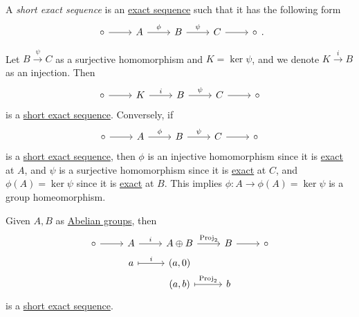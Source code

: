 \begin{definition}\label{def:short-exact-sequence}
	A \emph{short exact sequence} is an \hyperref[def:exact-sequence]{exact sequence} such that it has the following form
	\[
		\begin{tikzcd}
			\circ & A & B & C & \circ
			\arrow["\phi", from=1-2, to=1-3]
			\arrow["\psi", from=1-3, to=1-4]
			\arrow[from=1-1, to=1-2]
			\arrow[from=1-4, to=1-5]
		\end{tikzcd}.
	\]
\end{definition}

\begin{remark}
	Let \(B \overset{\psi}{\longrightarrow} C\) as a surjective homomorphism and \(K = \ker  \psi \), and we denote \(K \overset{i}{\longrightarrow}B \) as an injection. Then
	\[
		\begin{tikzcd}
			\circ & K & B & C & \circ
			\arrow["i", from=1-2, to=1-3]
			\arrow["\psi", from=1-3, to=1-4]
			\arrow[from=1-1, to=1-2]
			\arrow[from=1-4, to=1-5]
		\end{tikzcd}
	\]
	is a \hyperref[def:short-exact-sequence]{short exact sequence}. Conversely, if
	\[
		\begin{tikzcd}
			\circ & A & B & C & \circ
			\arrow["\phi ", from=1-2, to=1-3]
			\arrow["\psi", from=1-3, to=1-4]
			\arrow[from=1-1, to=1-2]
			\arrow[from=1-4, to=1-5]
		\end{tikzcd}
	\]
	is a \hyperref[def:short-exact-sequence]{short exact sequence}, then \(\phi \) is an injective homomorphism since it is \hyperref[def:apx:exact]{exact} at \(A\),
	and \(\psi \) is a surjective homomorphism since it is \hyperref[def:apx:exact]{exact} at \(C\), and \(\phi (A) = \ker \psi\) since it is \hyperref[def:apx:exact]{exact} at \(B\).
	This implies \(\phi \colon A\to \phi (A) = \ker  \psi \) is a group homeomorphism.
\end{remark}
\begin{eg}
	Given \(A, B\) as \hyperref[def:Abelian-group]{Abelian groups}, then
	\[
		\begin{tikzcd}[row sep=tiny]
			\circ & A & {A\oplus B} & B & \circ \\
			& a & {(a, 0)} \\
			&& {(a, b)} & b
			\arrow["i", from=1-2, to=1-3]
			\arrow["{\Proj_2}", from=1-3, to=1-4]
			\arrow[from=1-1, to=1-2]
			\arrow[from=1-4, to=1-5]
			\arrow["i", maps to, from=2-2, to=2-3]
			\arrow["{\Proj_2}", maps to, from=3-3, to=3-4]
		\end{tikzcd}
	\]
	is a \hyperref[def:short-exact-sequence]{short exact sequence}.
\end{eg}
